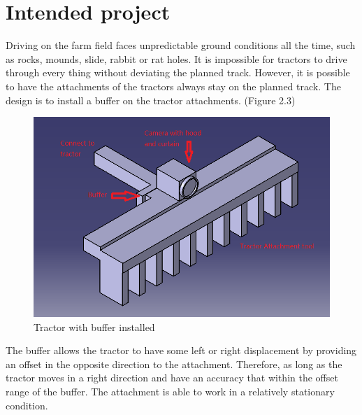 \documentclass[letterpaper,12pt,oneside]{book}
\begin{document}
		\section{Intended project}
		
		Driving on the farm field faces unpredictable ground conditions all the time, such as rocks, mounds, slide, rabbit or rat holes. It is impossible for tractors to drive through every thing without deviating the planned track. However, it is possible to have the attachments of the tractors always stay on the planned track. The design is to install a buffer on the tractor attachments. (Figure 2.3)
		\begin{figure}[ht!]
			\begin{center}
				\includegraphics[scale = 0.8]{attachmentwithbuffer.png}
				\caption{Tractor with buffer installed}
			\end{center}
		\end{figure} 
		The buffer allows the tractor to have some left or right displacement by providing an offset in the opposite direction to the attachment. Therefore, as long as the tractor moves in a right direction and have an accuracy that within the offset range of the buffer. The attachment is able to work in a relatively stationary condition. 
		
\end{document}
